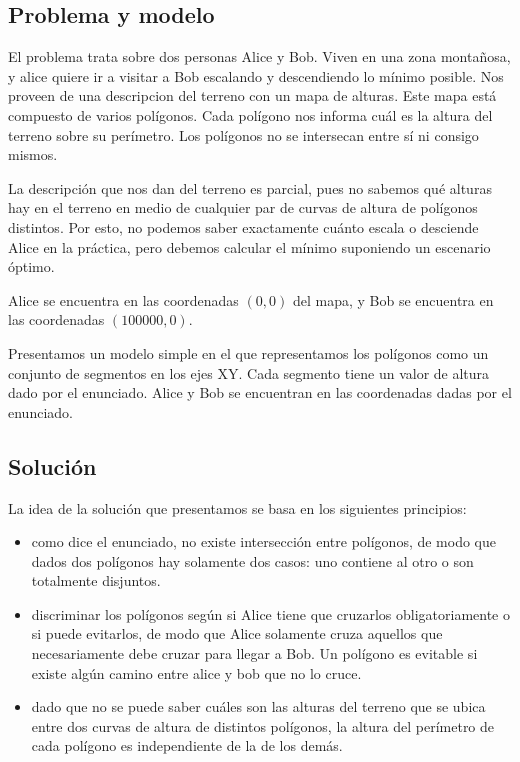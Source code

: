 \subsection*{Problema y modelo}

El problema trata sobre dos personas Alice y Bob. Viven en una zona montañosa, y alice quiere ir a visitar
a Bob escalando y descendiendo lo mínimo posible. Nos proveen de una descripcion del terreno con un mapa
de alturas. Este mapa está compuesto de varios polígonos. Cada polígono nos informa cuál es la altura del
terreno sobre su perímetro. Los polígonos no se intersecan entre sí ni consigo mismos.

La descripción que nos dan del terreno es parcial, pues no sabemos qué alturas hay en el terreno en medio
de cualquier par de curvas de altura de polígonos distintos. Por esto, no podemos saber exactamente cuánto
escala o desciende Alice en la práctica, pero debemos calcular el mínimo suponiendo un escenario óptimo.

Alice se encuentra en las coordenadas $(0, 0)$ del mapa, y Bob se encuentra en las coordenadas
$(100000, 0)$.

Presentamos un modelo simple en el que representamos los polígonos como un conjunto de segmentos en los
ejes XY. Cada segmento tiene un valor de altura dado por el enunciado. Alice y Bob se encuentran en las
coordenadas dadas por el enunciado.

\subsection*{Solución}

La idea de la solución que presentamos se basa en los siguientes principios:
\begin{itemize}
\item como dice el enunciado, no existe intersección entre polígonos, de modo que dados dos polígonos
hay solamente dos casos: uno contiene al otro o son totalmente disjuntos.
\item discriminar los polígonos según si Alice tiene que cruzarlos obligatoriamente o si puede
evitarlos, de modo que Alice solamente cruza aquellos que necesariamente debe cruzar para llegar a Bob.
Un polígono es evitable si existe algún camino entre alice y bob que no lo cruce.
\item dado que no se puede saber cuáles son las alturas del terreno que se ubica entre dos curvas de
altura de distintos polígonos, la altura del perímetro de cada polígono es independiente de la de los
demás.
\end{itemize}

